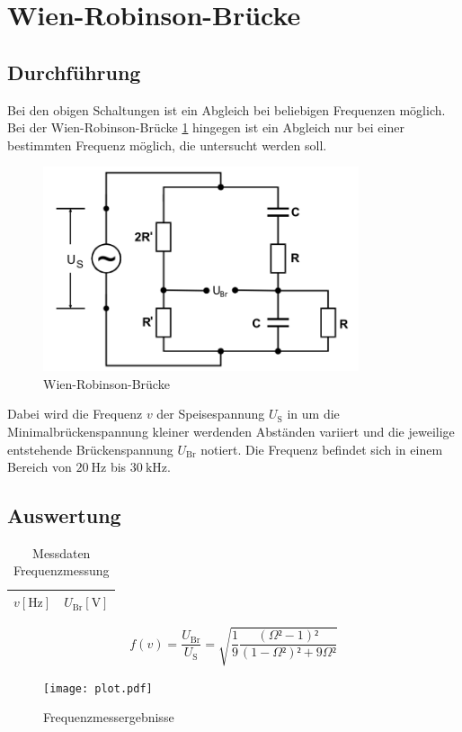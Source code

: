 \section{Wien-Robinson-Brücke}
\subsection{Durchführung}
Bei den obigen Schaltungen ist ein Abgleich bei beliebigen Frequenzen möglich.
Bei der Wien-Robinson-Brücke \ref{fig:5} hingegen ist ein Abgleich nur bei einer bestimmten Frequenz möglich, die untersucht werden soll.
\begin{figure}[H]
  \centering
  \includegraphics[height=6cm]{wien.png}
  \caption{Wien-Robinson-Brücke \cite{sample}}
  \label{fig:5}
\end{figure}
Dabei wird die Frequenz $v$ der Speisespannung $U_{\text{S}}$ in um die Minimalbrückenspannung kleiner werdenden Abständen variiert und die jeweilige entstehende Brückenspannung $U_{\text{Br}}$ notiert.
Die Frequenz befindet sich in einem Bereich von $\SI{20}{\hertz}$ bis $\SI{30}{\kilo\hertz}$.
\subsection{Auswertung}
\begin{table}
  \centering
  \caption{Messdaten Frequenzmessung}
  \label{tab:8}
  \begin{tabular}{c c}
    \toprule
    {$v [\si{\hertz}]$} & {$U_{\text{Br}} [\si{\volt}]$} \\
    \midrule
    
    \bottomrule
  \end{tabular}
\end{table}

\begin{equation}
  f(v) = \frac{U_{\text{Br}}}{U_{\text{S}}} = \sqrt{\frac{1}{9} \frac{\left(\Omega²-1 \right)²}{\left(1-\Omega² \right)²+9\Omega²}}
\end{equation}


\begin{figure}[H]
  \centering
  \texttt{[image: plot.pdf]}
  \caption{Frequenzmessergebnisse}
  \label{fig:6}
\end{figure}
